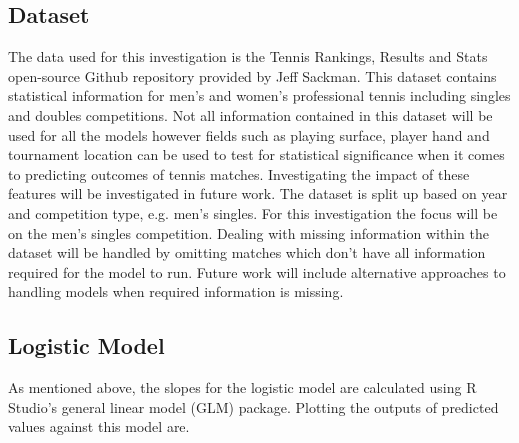 \documentclass[12pt,a4paper]{article}
\begin{document}
\subsection{Dataset}
The data used for this investigation is the Tennis Rankings, Results and Stats open-source
Github repository\cite{sackmann_jeffsackmanntennis_atp_2024} provided by Jeff Sackman.
This dataset contains
statistical information for men's and women's professional tennis including singles and
doubles competitions. Not all information contained in this dataset will be used for all
the models however fields such as playing surface, player hand and tournament location
can be used to test for statistical significance when it comes to predicting outcomes of
tennis matches. Investigating the impact of these features will be investigated in future
work. The dataset is split up based on year and competition type, e.g. men's
singles. For this investigation the focus will be on the men's singles competition.
Dealing with missing information within the dataset will be handled by omitting matches
which don't have all information required for the model to run. Future work will include
alternative approaches to handling models when required information is missing.

\subsection{Logistic Model}
As mentioned above, the slopes for the logistic model are
calculated using R Studio's general linear model (GLM) package. Plotting the
outputs of predicted values against this model are.
\end{document}
